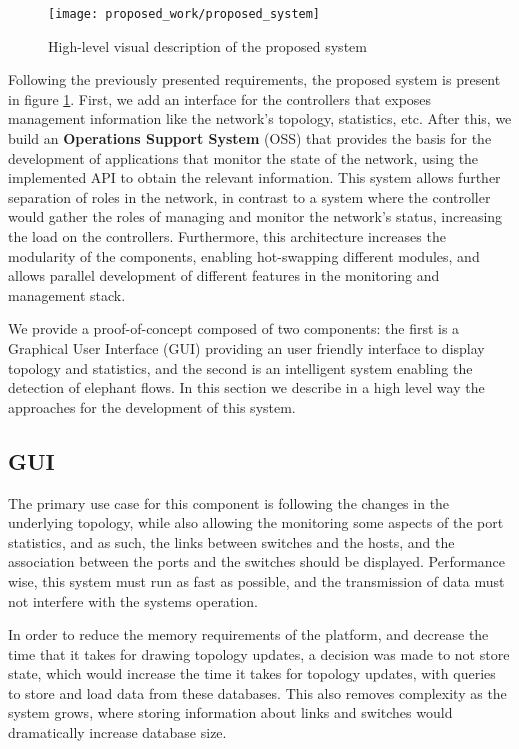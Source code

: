 \begin{figure} [h]
    \centering
    \texttt{[image: proposed\_work/proposed\_system]}
    \caption{High-level visual description of the proposed system} \label{fig:pro_sys}
\end{figure}

\par Following the previously presented requirements, the proposed system is present in figure \ref{fig:pro_sys}. First, we add an interface for the controllers that 
exposes management information like the network's topology, statistics, etc. After this, we build an \textbf{Operations Support System} (OSS) that provides the basis 
for the development of applications that monitor the state of the network, using the implemented API to obtain the relevant information. This system allows
further separation of roles in the network, in contrast to a system where the controller would gather the roles of managing and monitor the network's status, 
increasing the load on the controllers. Furthermore, this architecture increases the modularity of the components, enabling hot-swapping different modules, and
allows parallel development of different features in the monitoring and management stack.

\par We provide a proof-of-concept composed of two components: the first is a Graphical User Interface (GUI) providing an user friendly interface to display 
topology and statistics, and the second is an intelligent system enabling the detection of elephant flows. In this section we describe in a high level way the 
approaches for the development of this system.

\subsection {GUI}

The primary use case for this component is following the changes in the underlying topology, while also allowing the monitoring some aspects of the port statistics,
and as such, the links between switches and the hosts, and the association between the ports and the switches should be displayed. Performance wise, this system must
run as fast as possible, and the transmission of data must not interfere with the systems operation. 

\par In order to reduce the memory requirements of the platform, and decrease the time that it takes for drawing topology updates, a decision was made to not store 
state, which would increase the time it takes for topology updates, with queries to store and load data from these databases. This also removes complexity as the 
system grows, where storing information about links and switches would dramatically increase database size.

